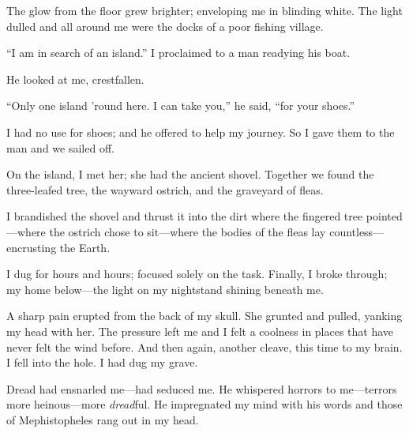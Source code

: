 \documentclass{article}
\begin{document}


\noindent
The glow from the floor grew brighter;
enveloping me in blinding white.
The light dulled and
all around me were the docks of a poor fishing village.
\VV


``I am in search of an island.''
I proclaimed to a man readying his boat.
\VV


\noindent
He looked at me, crestfallen.
\VV


``Only one island 'round here.
I can take you,'' he said, ``for your shoes.''
\VV


\noindent
I had no use for shoes; and he offered to help my journey.
So I gave them to the man and we sailed off.


On the island, I met her; she had the ancient shovel.
Together we found the three-leafed tree, the
wayward ostrich, and the graveyard of fleas.


I brandished the shovel and thrust it into the dirt
where the fingered tree pointed---where the ostrich
chose to sit---where the bodies of the fleas lay
countless---encrusting the Earth.


I dug for hours and hours; focused solely on the task.
Finally, I broke through; my home below---the
light on my nightstand shining beneath me.


A sharp pain erupted from the back of my skull.
She grunted and pulled, yanking my head with her.
The pressure left me and I felt a coolness in
places that have never felt the wind before.
And then again, another cleave, this time to my brain.
I fell into the hole. I had dug my grave.
\vvvv


\noindent
Dread had ensnarled me---had seduced me.
He whispered horrors to me---terrors
more heinous---more \textit{dread}ful.
He impregnated my mind with his words and
those of Mephistopheles rang out in my head.
\VV
\end{document}
